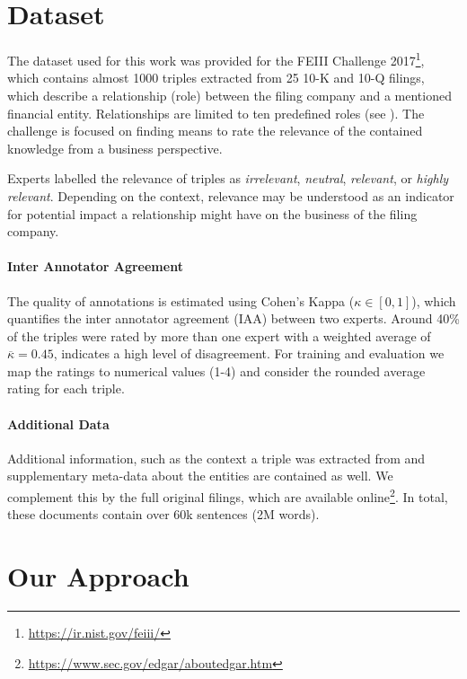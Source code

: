 \section{Dataset}
The dataset used for this work was provided for the FEIII Challenge 2017\footnote{\url{https://ir.nist.gov/feiii/}}, which contains almost 1000 triples extracted from 25 10-K and 10-Q filings, which describe a relationship (role) between the filing company and a mentioned financial entity.
Relationships are limited to ten predefined roles (see ).
The challenge is focused on finding means to rate the relevance of the contained knowledge from a business perspective.

Experts labelled the relevance of triples as \textit{irrelevant}, \textit{neutral}, \textit{relevant}, or \textit{highly relevant}.
Depending on the context, relevance may be understood as an indicator for potential impact a relationship might have on the business of the filing company. 


\paragraph{\textbf{Inter Annotator Agreement}}
The quality of annotations is estimated using Cohen's Kappa ($\kappa\in [0,1]$), which quantifies the inter annotator agreement (IAA) between two experts\cite{ir}.
Around 40\% of the triples were rated by more than one expert with a weighted average of $\overline{\kappa}=0.45$, indicates a high level of disagreement.
For training and evaluation we map the ratings to numerical values (1-4) and consider the rounded average rating for each triple.

\paragraph{\textbf{Additional Data}}
Additional information, such as the context a triple was extracted from and supplementary meta-data about the entities are contained as well.
We complement this by the full original filings, which are available online\footnote{\url{https://www.sec.gov/edgar/aboutedgar.htm}}.
In total, these documents contain over 60k sentences (2M words).

\section{Our Approach}

